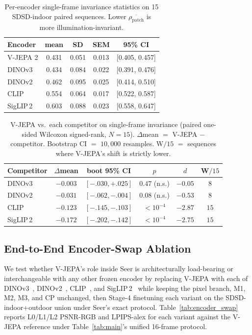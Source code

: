 \begin{table}[h]
\centering\small\setlength{\tabcolsep}{5pt}
\begin{tabular}{lcccc}
\toprule
Encoder & mean & SD & SEM & 95\% CI \\
\midrule
V-JEPA 2   & 0.431 & 0.051 & 0.013 & [0.405, 0.457] \\
DINOv3     & 0.434 & 0.084 & 0.022 & [0.391, 0.476] \\
DINOv2     & 0.462 & 0.095 & 0.025 & [0.414, 0.510] \\
CLIP       & 0.554 & 0.064 & 0.017 & [0.522, 0.587] \\
SigLIP\,2  & 0.603 & 0.088 & 0.023 & [0.558, 0.647] \\
\bottomrule
\end{tabular}
\caption{Per-encoder single-frame invariance statistics on 15 SDSD-indoor paired sequences. Lower $\overline{\rho_{\text{patch}}}$ is more illumination-invariant.}
\label{tab:encoder_stats}
\end{table}

\begin{table}[h]
\centering\footnotesize\setlength{\tabcolsep}{3pt}
\begin{tabular}{lccccc}
\toprule
Competitor & $\Delta$mean & boot 95\% CI & $p$ & $d$ & W$/15$ \\
\midrule
DINOv3     & $-0.003$ & $[-.030,+.025]$ & $0.47$ (n.s.)   & $-0.05$ & $8$ \\
DINOv2     & $-0.031$ & $[-.062,-.004]$ & $0.08$ (n.s.)   & $-0.53$ & $8$ \\
CLIP       & $-0.123$ & $[-.145,-.103]$ & ${<}10^{-4}$    & $-2.87$ & $15$ \\
SigLIP\,2  & $-0.172$ & $[-.202,-.142]$ & ${<}10^{-4}$    & $-2.75$ & $15$ \\
\bottomrule
\end{tabular}
\caption{V-JEPA vs.\ each competitor on single-frame invariance (paired one-sided Wilcoxon signed-rank, $N{=}15$). $\Delta$mean $=$ V-JEPA $-$ competitor. Bootstrap CI $=$ $10{,}000$ resamples. W$/15$ $=$ sequences where V-JEPA's shift is strictly lower.}
\label{tab:encoder_pairwise}
\end{table}


\subsection{End-to-End Encoder-Swap Ablation}\label{app:encoder_swap}

We test whether V-JEPA's role inside Seer is architecturally load-bearing or interchangeable with any other frozen encoder by replacing V-JEPA with each of DINOv3~\citep{dinov3}, DINOv2~\citep{dinov2}, CLIP~\citep{clip}, and SigLIP\,2~\citep{siglip2} while keeping the pixel branch, M1, M2, M3, and CP unchanged, then Stage-4 finetuning each variant on the SDSD-indoor+outdoor union under Seer's exact protocol. Table~\ref{tab:encoder_swap} reports L0/L1/L2 PSNR-RGB and LPIPS-alex for each variant against the V-JEPA reference under Table~\ref{tab:main}'s unified 16-frame protocol.

